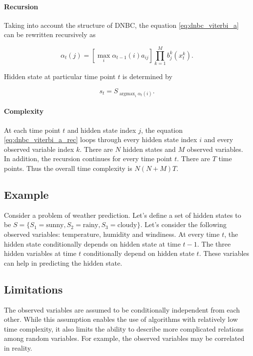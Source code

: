 \documentclass[thesis=B,english]{FITthesis}[2012/06/26]
\DeclareMathOperator*{\argmax}{argmax} %
\begin{document}
\paragraph{Recursion}
Taking into account the structure of DNBC, the equation \ref{eq:dnbc_viterbi_a} can be rewritten recursively as

\begin{equation} \label{eq:dnbc_viterbi_a_rec}
\alpha_t(j) = [\max_i \alpha_{t-1}(i)a_{ij}] \prod_{k=1}^M b_j^k(x^k_t).
\end{equation}

Hidden state at particular time point $t$ is determined by

\begin{equation}
s_t = S_{\argmax_i \alpha_{t}(i)}.
\end{equation}

\paragraph{Complexity}

At each time point $t$ and hidden state index $j$, the equation \ref{eq:dnbc_viterbi_a_rec} loops through every hidden state index $i$ and every observed variable index $k$. There are $N$ hidden states and $M$ observed variables. In addition, the recursion continues for every time point $t$. There are $T$ time points. Thus the overall time complexity is
$N(N+M) T$.

\subsection{Example}

Consider a problem of weather prediction. Let's define a set of hidden states to be $S = \{S_1 = \text{sunny}, S_2 = \text{rainy}, S_3 = \text{cloudy} \}$. Let's consider the following observed variables: temperature, humidity and windiness. At every time $t$, the hidden state conditionally depends on hidden state at time $t-1$. The three hidden variables at time $t$ conditionally depend on hidden state $t$. These variables can help in predicting the hidden state.

\subsection{Limitations}

The observed variables are assumed to be conditionally independent from each other. While this assumption enables the use of algorithms with relatively low time complexity, it also limits the ability to describe more complicated relations among random variables. For example, the observed variables may be correlated in reality.
\end{document}
